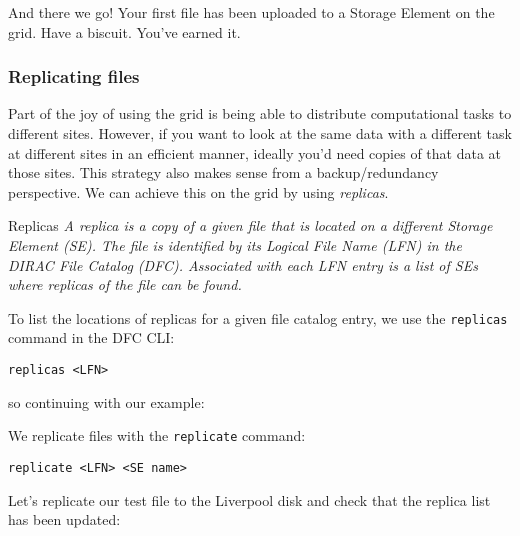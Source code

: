 And there we go! Your first file has been uploaded to a Storage Element
on the grid. Have a biscuit. You've earned it.

\subsubsection{Replicating files}
\label{replicating-files}
Part of the joy of using the grid is being able to distribute
computational tasks to different sites. However, if you want to look at
the same data with a different task at different sites in an efficient
manner, ideally you'd need copies of that data at those sites. This
strategy also makes sense from a backup/redundancy perspective. We can
achieve this on the grid by using \emph{replicas}.

\begin{infobox}{Replicas}
\emph{A replica is a copy of a given file that is located on a different
Storage Element (SE). The file is identified by its Logical File Name
(LFN) in the DIRAC File Catalog (DFC). Associated with each LFN entry is
a list of SEs where replicas of the file can be found.}
\end{infobox}

To list the locations of replicas for a given file catalog entry, we use
the \texttt{replicas} command in the DFC CLI:

\begin{verbatim}
replicas <LFN>
\end{verbatim}

so continuing with our example:

\begin{Shaded}
\begin{Highlighting}[]
\KeywordTok{>}
\end{Highlighting}
\end{Shaded}

We replicate files with the \texttt{replicate} command:

\begin{verbatim}
replicate <LFN> <SE name>
\end{verbatim}

Let's replicate our test file to the Liverpool disk and check that the
replica list has been updated:


